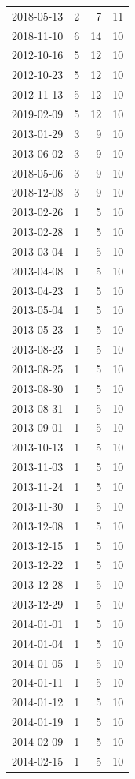 \begin{tabular}{lrrr}
2018-05-13 & 2 & 7 & 11 \\
2018-11-10 & 6 & 14 & 10 \\
2012-10-16 & 5 & 12 & 10 \\
2012-10-23 & 5 & 12 & 10 \\
2012-11-13 & 5 & 12 & 10 \\
2019-02-09 & 5 & 12 & 10 \\
2013-01-29 & 3 & 9 & 10 \\
2013-06-02 & 3 & 9 & 10 \\
2018-05-06 & 3 & 9 & 10 \\
2018-12-08 & 3 & 9 & 10 \\
2013-02-26 & 1 & 5 & 10 \\
2013-02-28 & 1 & 5 & 10 \\
2013-03-04 & 1 & 5 & 10 \\
2013-04-08 & 1 & 5 & 10 \\
2013-04-23 & 1 & 5 & 10 \\
2013-05-04 & 1 & 5 & 10 \\
2013-05-23 & 1 & 5 & 10 \\
2013-08-23 & 1 & 5 & 10 \\
2013-08-25 & 1 & 5 & 10 \\
2013-08-30 & 1 & 5 & 10 \\
2013-08-31 & 1 & 5 & 10 \\
2013-09-01 & 1 & 5 & 10 \\
2013-10-13 & 1 & 5 & 10 \\
2013-11-03 & 1 & 5 & 10 \\
2013-11-24 & 1 & 5 & 10 \\
2013-11-30 & 1 & 5 & 10 \\
2013-12-08 & 1 & 5 & 10 \\
2013-12-15 & 1 & 5 & 10 \\
2013-12-22 & 1 & 5 & 10 \\
2013-12-28 & 1 & 5 & 10 \\
2013-12-29 & 1 & 5 & 10 \\
2014-01-01 & 1 & 5 & 10 \\
2014-01-04 & 1 & 5 & 10 \\
2014-01-05 & 1 & 5 & 10 \\
2014-01-11 & 1 & 5 & 10 \\
2014-01-12 & 1 & 5 & 10 \\
2014-01-19 & 1 & 5 & 10 \\
2014-02-09 & 1 & 5 & 10 \\
2014-02-15 & 1 & 5 & 10 \\

\end{tabular}

